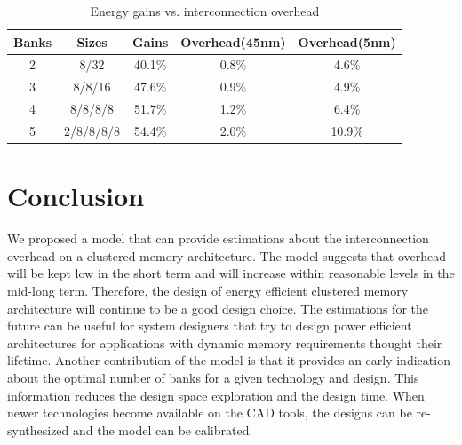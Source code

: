 \begin{center}
	\begin{table}
	\centering
	\caption{Energy gains vs. interconnection overhead}
	\label{tab:GainvsOverhead}
	{
	\begin{tabular}{|c|c|c|c|c|}
	\hline
	Banks & Sizes & Gains & Overhead(45nm) & Overhead(5nm) \\
	\hline
	2 & 8/32 & 40.1\%   & 0.8\%  & 4.6\%  \\
	\hline 
	3 & 8/8/16 & 47.6\%   & 0.9\%  & 4.9\% \\
	\hline 
	4 & 8/8/8/8 & 51.7\% & 1.2\% & 6.4\% \\
	\hline
	5 & 2/8/8/8/8 & 54.4\% & 2.0\% & 10.9\% \\
	\hline	
	\end{tabular}}
	\end{table}
\end{center}
  
\section{Conclusion}
\label{conclusionE}

We proposed a model that can provide estimations about the interconnection overhead on a clustered memory architecture.
The model suggests that overhead will be kept low in the short term and will increase within reasonable levels in the mid-long term.
Therefore, the design of energy efficient clustered memory architecture will continue to be a good design choice.
The estimations for the future can be useful for system designers that try to design power efficient architectures for applications with dynamic memory requirements thought their lifetime.
Another contribution of the model is that it provides an early indication about the optimal number of banks for a given technology and design.
This information reduces the design space exploration and the design time. 
When newer technologies become available on the CAD tools, the designs can be re-synthesized and the model can be calibrated.




%
